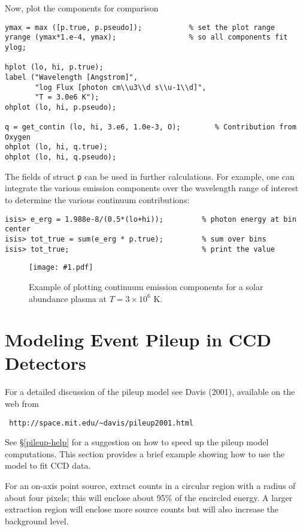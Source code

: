 \documentclass{book}
\newcommand{\putfig}[1]{\texttt{[image: \#1.pdf]}}
\newcommand{\putfig}[1]{\psfig{file=#1.ps}}
\begin{document}
Now, plot the components for comparison
\begin{verbatim}
ymax = max ([p.true, p.pseudo]);           % set the plot range
yrange (ymax*1.e-4, ymax);                 % so all components fit
ylog;

hplot (lo, hi, p.true);
label ("Wavelength [Angstrom]",
       "log Flux [photon cm\\u3\\d s\\u-1\\d]",
       "T = 3.0e6 K");
ohplot (lo, hi, p.pseudo);

q = get_contin (lo, hi, 3.e6, 1.0e-3, O);        % Contribution from Oxygen
ohplot (lo, hi, q.true);
ohplot (lo, hi, q.pseudo);
\end{verbatim}

The fields of struct {\tt p} can be used in further calculations. For
example, one can integrate the various emission components over the
wavelength range of interest to determine the various continuum
contributions:
\begin{verbatim}
isis> e_erg = 1.988e-8/(0.5*(lo+hi));         % photon energy at bin center
isis> tot_true = sum(e_erg * p.true);         % sum over bins
isis> tot_true;                               % print the value
\end{verbatim}

\begin{figure}[ht]
\putfig{figures/contin}
\caption{Example of plotting continuum emission components for a solar abundance plasma at $T = 3 \times 10^6$ K.}
\label{fig:contin}
\end{figure}

\section{Modeling Event Pileup in CCD Detectors}
\label{sec:pileup}

For a detailed discussion of the pileup model see Davis (2001),
available on the web from
\begin{verbatim}
 http://space.mit.edu/~davis/pileup2001.html
\end{verbatim}
See \S\ref{pileup-help} for a suggestion on how to speed up
the pileup model computations.
This section provides a brief example showing how to use the
model to fit CCD data.

For an on-axis point source, extract counts in a circular region
with a radius of about four pixels; this will enclose
about 95\% of the encircled energy.  A larger extraction
region will enclose more source counts but will also increase
the background level.
\end{document}
